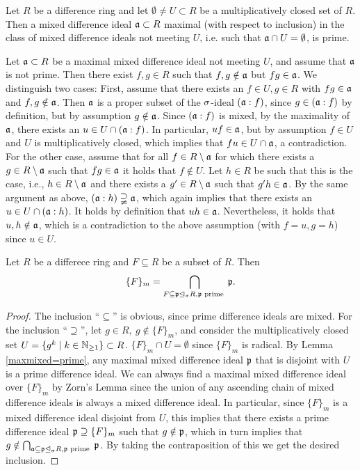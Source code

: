 \begin{lem}\label{maxmixed=prime}
Let $R$ be a difference ring and let $\emptyset \neq U \subset R$ be a multiplicatively closed set of $R$. Then a mixed difference ideal $\mathfrak{a} \subset R$ maximal (with respect to inclusion) in the class of mixed difference
ideals not meeting $U$, i.e. such that $\mathfrak{a} \cap U = \emptyset$, is prime. 
\begin{bew}
Let $\mathfrak{a} \subset R$ be a maximal mixed difference ideal not meeting $U$, and assume that $\mathfrak{a}$ is not prime. Then there exist $f, g \in R$ such that $f,g \notin \mathfrak{a}$ but $fg \in \mathfrak{a}$.
We distinguish two cases: First, assume that there exists an $f \in U, g \in R$ with $fg \in \mathfrak{a}$ and $f, g \notin \mathfrak{a}$. Then $\mathfrak{a}$ is a proper subset of the $\sigma$-ideal $(\mathfrak{a}:f)$, since $g \in (\mathfrak{a}:f)$ by definition, but by assumption $g \notin \mathfrak{a}$.
Since $(\mathfrak{a}:f)$ is mixed, by the maximality of $\mathfrak{a}$, there exists an $u \in U \cap (\mathfrak{a}:f)$. In particular, $uf \in \mathfrak{a}$, but by assumption $f \in U$ and $U$ is multiplicatively closed, which implies that $fu \in U \cap \mathfrak{a}$, a contradiction. \\
For the other case, assume that for all $f \in R \setminus \mathfrak{a}$ for which there exists a $g \in R \setminus \mathfrak{a}$ such that $fg \in \mathfrak{a}$ it holds that $f \notin U$. Let $h \in R$ be such that this is the case, i.e., $h \in R \setminus \mathfrak{a}$ and there exists a $g' \in R \setminus \mathfrak{a}$ such that $g'h \in \mathfrak{a}$.
By the same argument as above, $(\mathfrak{a}:h) \supsetneqq \mathfrak{a}$, which again implies that there exists an $u \in U \cap (\mathfrak{a}:h)$. It holds by definition that $uh \in \mathfrak{a}$. Nevertheless,  it holds that $u,h \notin \mathfrak{a}$, which is a contradiction to the above assumption (with $f = u, g = h$) since $u \in U$. 
\end{bew}
\end{lem}

\begin{theorem}
Let $R$ be a differece ring and $F \subseteq R$ be a subset of $R$. Then
\[ \{ F \}_m = \bigcap_{F \subseteq \mathfrak{p} \unlhd_{\sigma} R, \mathfrak{p} \text{ prime }} \mathfrak{p}.\]
\begin{proof}
The inclusion ``$\subseteq$'' is obvious, since prime difference ideals are mixed. For the inclusion ``$\supseteq$'', let $g \in R, ~ g \notin \{ F \}_m$, and consider the multiplicatively closed set $U = \{ g^k \mid k \in \mathbb{N}_{\geq1} \} \subset R$. 
$\{ F \}_m \cap U = \emptyset$ since $\{ F \}_m$ is radical. By Lemma \ref{maxmixed=prime}, any maximal mixed difference ideal $\mathfrak{p}$ that is disjoint with $U$ is a prime difference ideal. We can always find a maximal mixed difference ideal over $\{F\}_m$ by Zorn's Lemma since
the union of any ascending chain of mixed difference ideals is always a mixed difference ideal. In particular, since $\{F\}_m$ is a mixed difference ideal disjoint from $U$, this implies that there exists a prime difference ideal $\mathfrak{p} \supseteq \{F\}_m$ such that $g \notin \mathfrak{p}$,
which in turn implies that $g \notin \bigcap_{\mathfrak{a} \subseteq \mathfrak{p} \unlhd_{\sigma} R, \mathfrak{p} \text{ prime }} \mathfrak{p}$. By taking the contraposition of this we get the desired inclusion.
\end{proof}
\end{theorem}

